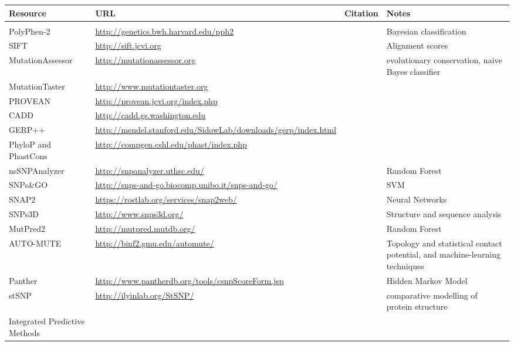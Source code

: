 \documentclass{article}
\begin{document}
\begin{table}[p]
\centering
\begin{tabularx}{\textwidth}{p{3cm}Xp{1.7cm}X}
  \hline
Resource & URL & Citation & Notes \\
  \hline
 &  &  &  \\
  PolyPhen-2 & \url{http://genetics.bwh.harvard.edu/pph2} & \cite{Adzhubei2013-nj} & Bayesian classification \\
  SIFT & \url{http://sift.jcvi.org} & \cite{Ng2003-vp} & Alignment scores \\
  MutationAssessor & \url{http://mutationassessor.org} & \cite{Reva2011-en} & evolutionary conservation,  naive Bayes classifier \\
  MutationTaster & \url{http://www.mutationtaster.org} & \cite{Schwarz2014-ep} &   \\
  PROVEAN & \url{http://provean.jcvi.org/index.php} & \cite{Choi2012-tk} &   \\
  CADD & \url{http://cadd.gs.washington.edu} & \cite{Kircher2014-im} &   \\
  GERP++ & \url{http://mendel.stanford.edu/SidowLab/downloads/gerp/index.html} & \cite{Davydov2010-ui} &   \\
  PhyloP and PhastCons & \url{http://compgen.cshl.edu/phast/index.php} & \cite{Siepel2005-ke,Pollard2010-of} &   \\
  nsSNPAnalyzer & \url{http://snpanalyzer.uthsc.edu/} & \cite{Bao2005-jn} & Random Forest \\
  SNPs\&GO & \url{http://snps-and-go.biocomp.unibo.it/snps-and-go/} & \cite{Calabrese2009-mi} & SVM \\
  SNAP2 & \url{https://rostlab.org/services/snap2web/} & \cite{Hecht2015-ti} & Neural Networks \\
  SNPs3D & \url{http://www.snps3d.org/} & \cite{Yue2006-kj} & Structure and sequence analysis \\
  MutPred2 & \url{http://mutpred.mutdb.org/} & \cite{Pejaver2017-lr} & Random Forest \\
  AUTO-MUTE & \url{http://binf2.gmu.edu/automute/} & \cite{Masso2010-gf} & Topology  and statistical contact potential, and machine-learning techniques \\ 
  Panther & \url{http://www.pantherdb.org/tools/csnpScoreForm.jsp} & \cite{Thomas2003-rj} & Hidden Markov Model \\
  stSNP & \url{http://ilyinlab.org/StSNP/} & \cite{Uzun2007-bk} & comparative modelling of protein structure \\
  Integrated Predictive Methods &  &  &   \\

\end{tabularx}
\end{table}
\end{document}
